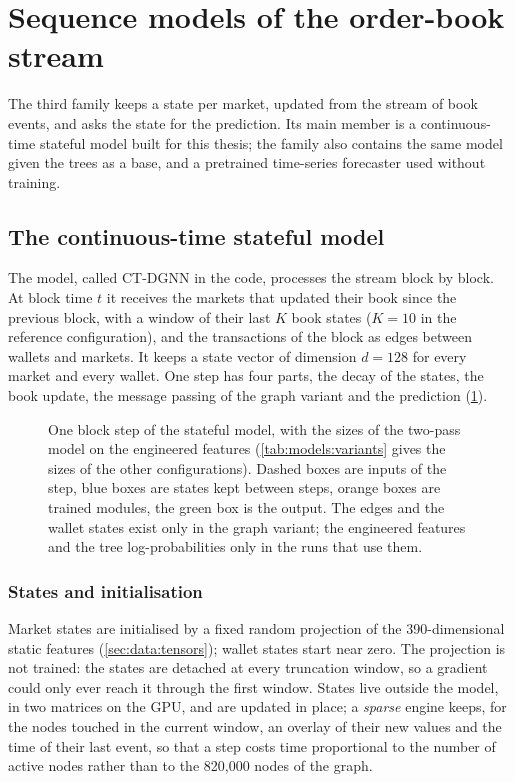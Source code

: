\section{Sequence models of the order-book stream}
\label{sec:models:sequence}

The third family keeps a state per market, updated from the stream of book events, and
asks the state for the prediction.  Its main member is a continuous-time stateful model
built for this thesis; the family also contains the same model given the trees as a base,
and a pretrained time-series forecaster used without training.

\subsection{The continuous-time stateful model}
\label{sec:models:ctdgnn}

The model, called CT-DGNN in the code, processes the stream block by block.  At block
time $t$ it receives the markets that updated their book since the previous block, with
a window of their last $K$ book states ($K = 10$ in the reference configuration), and
the transactions of the block as
edges between wallets and markets.  It keeps a state vector of dimension $d = 128$ for
every market and every wallet.  One step has four parts, the decay of the states, the
book update, the message passing of the graph variant and the prediction
(\cref{fig:models:architecture}).

\begin{figure}[t]
\centering
\resizebox{\textwidth}{!}{}
\caption{One block step of the stateful model, with the sizes of the two-pass model on the
engineered features (\cref{tab:models:variants} gives the sizes of the other configurations).
Dashed boxes are inputs of the step, blue boxes are states kept between steps, orange
boxes are trained modules, the green box is the output.  The edges and the wallet states
exist only in the graph variant; the engineered features and the tree log-probabilities only in
the runs that use them.}
\label{fig:models:architecture}
\end{figure}

\subsubsection{States and initialisation}
\label{sec:models:state}

Market states are initialised by a fixed random projection of the 390-dimensional
static features (\cref{sec:data:tensors}); wallet states start near zero.  The
projection is not trained: the states are detached at every truncation window, so a
gradient could only ever reach it through the first window.  States live outside the
model, in two matrices on the GPU, and are updated in place; a \emph{sparse} engine
keeps, for the nodes touched in the current window, an overlay of their new values and
the time of their last event, so that a step costs time proportional to the number of
active nodes rather than to the 820{,}000 nodes of the graph.

